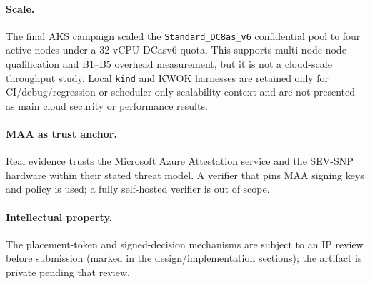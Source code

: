 \paragraph{Scale.}
The final AKS campaign scaled the \texttt{Standard\_DC8as\_v6} confidential pool
to four active nodes under a 32-vCPU DCasv6 quota. This supports multi-node node
qualification and B1--B5 overhead measurement, but it is not a cloud-scale
throughput study. Local \texttt{kind} and KWOK harnesses are retained only for
CI/debug/regression or scheduler-only scalability context and are not presented
as main cloud security or performance results.

\paragraph{MAA as trust anchor.}
Real evidence trusts the Microsoft Azure Attestation service and the SEV-SNP
hardware within their stated threat model. A verifier that pins MAA signing keys
and policy is used; a fully self-hosted verifier is out of scope.

\paragraph{Intellectual property.}
The placement-token and signed-decision mechanisms are subject to an IP review
before submission (marked in the design/implementation sections); the artifact is
private pending that review.
